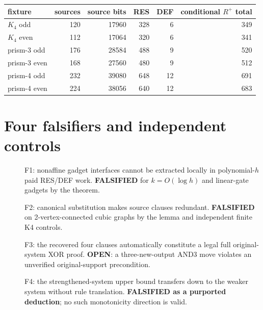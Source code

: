 \documentclass[11pt]{article}
\begin{document}
\begin{center}\begin{tabular}{lrrrrr}\toprule
fixture & sources & source bits & RES & DEF & conditional $R^+$ total\\\midrule
$K_4$ odd&120&17960&328&6&349\\
$K_4$ even&112&17064&320&6&341\\
prism-3 odd&176&28584&488&9&520\\
prism-3 even&168&27560&480&9&512\\
prism-4 odd&232&39080&648&12&691\\
prism-4 even&224&38056&640&12&683\\\bottomrule\end{tabular}\end{center}

\section*{Four falsifiers and independent controls}
\begin{description}
\item[] F1: nonaffine gadget interfaces cannot be extracted locally in polynomial-$h$ paid RES/DEF work. \textbf{FALSIFIED} for $k=O(\log h)$ and linear-gate gadgets by the theorem.
\item[] F2: canonical substitution makes source clauses redundant. \textbf{FALSIFIED} on 2-vertex-connected cubic graphs by the lemma and independent finite K4 controls.
\item[] F3: the recovered four clauses automatically constitute a legal full original-system XOR proof. \textbf{OPEN}: a three-new-output AND3 move violates an unverified original-support precondition.
\item[] F4: the strengthened-system upper bound transfers down to the weaker system without rule translation. \textbf{FALSIFIED as a purported deduction}; no such monotonicity direction is valid.
\end{description}
\end{document}
